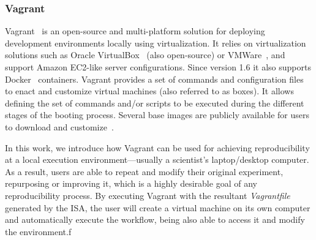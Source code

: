 \subsubsection{Vagrant}

Vagrant~\cite{palat2012introducing} is an open-source and multi-platform solution for deploying 
development environments locally using virtualization. It relies on virtualization solutions such as 
Oracle VirtualBox~\cite{Watson2008} (also open-source) or  VMWare~\cite{vmware}, and support 
Amazon EC2-like server configurations. Since version 1.6 it also supports Docker~\cite{Merkel2014} 
containers.
Vagrant provides a set of commands and configuration files to enact and customize virtual machines
(also referred to as boxes). It allows defining the set of commands and/or scripts to be executed during 
the different stages of the booting process. Several base images are publicly available for users to 
download and customize~\cite{vagrantbox}. 
 
In this work, we introduce how Vagrant can be used for achieving reproducibility at a local execution
environment---usually a scientist's laptop/desktop computer. As a result, users are able to repeat and 
modify their original experiment, repurposing or improving it, which is a highly desirable goal of any 
reproducibility process. By executing Vagrant with the resultant {\it Vagrantfile} generated by the ISA, 
the user will create a virtual machine on its own computer and automatically execute the workflow, 
being also able to access it and modify the environment.f




